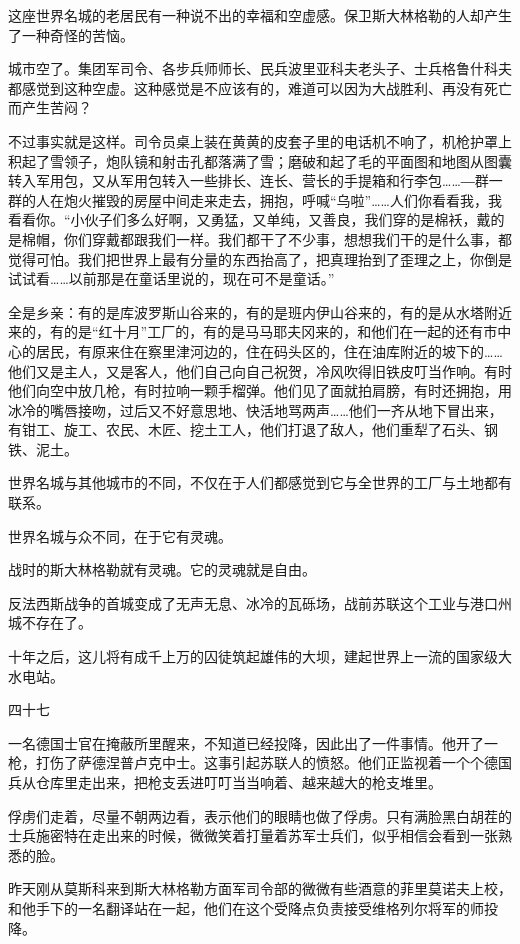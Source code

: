 这座世界名城的老居民有一种说不出的幸福和空虚感。保卫斯大林格勒的人却产生了一种奇怪的苦恼。

城市空了。集团军司令、各步兵师师长、民兵波里亚科夫老头子、士兵格鲁什科夫都感觉到这种空虚。这种感觉是不应该有的，难道可以因为大战胜利、再没有死亡而产生苦闷？

不过事实就是这样。司令员桌上装在黄黄的皮套子里的电话机不响了，机枪护罩上积起了雪领子，炮队镜和射击孔都落满了雪；磨破和起了毛的平面图和地图从图囊转入军用包，又从军用包转入一些排长、连长、营长的手提箱和行李包……―群一群的人在炮火摧毁的房屋中间走来走去，拥抱，呼喊“乌啦”……人们你看看我，我看看你。“小伙子们多么好啊，又勇猛，又单纯，又善良，我们穿的是棉袄，戴的是棉帽，你们穿戴都跟我们一样。我们都干了不少事，想想我们干的是什么事，都觉得可怕。我们把世界上最有分量的东西抬高了，把真理抬到了歪理之上，你倒是试试看……以前那是在童话里说的，现在可不是童话。”

全是乡亲：有的是库波罗斯山谷来的，有的是班内伊山谷来的，有的是从水塔附近来的，有的是“红十月”工厂的，有的是马马耶夫冈来的，和他们在一起的还有市中心的居民，有原来住在察里津河边的，住在码头区的，住在油库附近的坡下的……他们又是主人，又是客人，他们自己向自己祝贺，冷风吹得旧铁皮叮当作响。有时他们向空中放几枪，有时拉响一颗手榴弹。他们见了面就拍肩膀，有时还拥抱，用冰冷的嘴唇接吻，过后又不好意思地、快活地骂两声……他们一齐从地下冒出来，有钳工、旋工、农民、木匠、挖土工人，他们打退了敌人，他们重犁了石头、钢铁、泥土。

世界名城与其他城市的不同，不仅在于人们都感觉到它与全世界的工厂与土地都有联系。

世界名城与众不同，在于它有灵魂。

战时的斯大林格勒就有灵魂。它的灵魂就是自由。

反法西斯战争的首城变成了无声无息、冰冷的瓦砾场，战前苏联这个工业与港口州城不存在了。

十年之后，这儿将有成千上万的囚徒筑起雄伟的大坝，建起世界上一流的国家级大水电站。

四十七

一名德国士官在掩蔽所里醒来，不知道已经投降，因此出了一件事情。他开了一枪，打伤了萨德涅普卢克中士。这事引起苏联人的愤怒。他们正监视着一个个德国兵从仓库里走出来，把枪支丢进叮叮当当响着、越来越大的枪支堆里。

俘虏们走着，尽量不朝两边看，表示他们的眼睛也做了俘虏。只有满脸黑白胡茬的士兵施密特在走出来的时候，微微笑着打量着苏军士兵们，似乎相信会看到一张熟悉的脸。

昨天刚从莫斯科来到斯大林格勒方面军司令部的微微有些酒意的菲里莫诺夫上校，和他手下的一名翻译站在一起，他们在这个受降点负责接受维格列尔将军的师投降。

